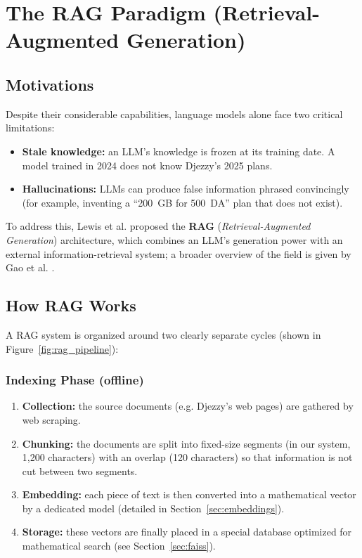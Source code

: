 \documentclass[12pt, a4paper]{report}
\newcommand{\sourced}[1]{#1}        %
\newcommand{\humantext}[1]{#1}      %
\begin{document}
\section{The RAG Paradigm (Retrieval-Augmented Generation)}

\subsection{Motivations}
\humantext{Despite their considerable capabilities, language models alone face two critical limitations:}
\begin{itemize}[noitemsep]
    \item \humantext{\textbf{Stale knowledge:} an LLM's knowledge is frozen at its training date. A model trained in 2024 does not know Djezzy's 2025 plans.}
    \item \humantext{\textbf{Hallucinations:} LLMs can produce false information phrased convincingly (for example, inventing a ``200~GB for 500~DA'' plan that does not exist).}
\end{itemize}

\sourced{To address this, Lewis et al. \cite{lewis2020rag} proposed the \textbf{RAG} (\textit{Retrieval-Augmented Generation}) architecture, which combines an LLM's generation power with an external information-retrieval system; a broader overview of the field is given by Gao et al. \cite{gao2023ragsurvey}.}

\subsection{How RAG Works}
\humantext{A RAG system is organized around two clearly separate cycles (shown in Figure~\ref{fig:rag_pipeline}):}

\subsubsection{Indexing Phase (offline)}
\begin{enumerate}[noitemsep]
    \item \humantext{\textbf{Collection:} the source documents (e.g. Djezzy's web pages) are gathered by web scraping.}
    \item \humantext{\textbf{Chunking:} the documents are split into fixed-size segments (in our system, 1{,}200 characters) with an overlap (120 characters) so that information is not cut between two segments.}
    \item \humantext{\textbf{Embedding:} each piece of text is then converted into a mathematical vector by a dedicated model (detailed in Section~\ref{sec:embeddings}).}
    \item \humantext{\textbf{Storage:} these vectors are finally placed in a special database optimized for mathematical search (see Section~\ref{sec:faiss}).}
\end{enumerate}
\end{document}
